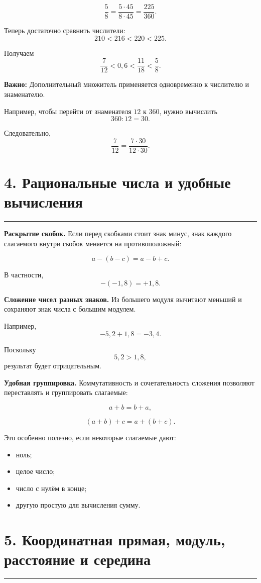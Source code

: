 \documentclass[a4paper,12pt]{article}
\newcommand{\sectionline}{
  \par
  \vspace{-0.35em}
  {\color{accent}\rule{\linewidth}{0.5pt}}
  \vspace{0.55em}
}
\newcommand{\skill}[1]{\textbf{\color{darkaccent}#1}}
\newcommand{\warn}[1]{\textbf{Важно:} #1}
\begin{document}
\[
\frac58
=
\frac{5\cdot 45}{8\cdot 45}
=
\frac{225}{360}.
\]

Теперь достаточно сравнить числители:
\[
210<216<220<225.
\]

Получаем
\[
\frac7{12}
<
0,6
<
\frac{11}{18}
<
\frac58.
\]

\warn{Дополнительный множитель применяется одновременно
к числителю и знаменателю.}

Например, чтобы перейти от знаменателя $12$ к $360$,
нужно вычислить
\[
360:12=30.
\]

Следовательно,
\[
\frac7{12}
=
\frac{7\cdot30}{12\cdot30}.
\]


\section*{4. Рациональные числа и удобные вычисления}
\sectionline

\skill{Раскрытие скобок.}
Если перед скобками стоит знак минус,
знак каждого слагаемого внутри скобок меняется
на противоположный:

\[
a-(b-c)=a-b+c.
\]

В частности,
\[
-(-1,8)=+1,8.
\]

\skill{Сложение чисел разных знаков.}
Из большего модуля вычитают меньший
и сохраняют знак числа с большим модулем.

Например,
\[
-5,2+1,8=-3,4.
\]

Поскольку
\[
5,2>1,8,
\]
результат будет отрицательным.

\skill{Удобная группировка.}
Коммутативность и сочетательность сложения позволяют
переставлять и группировать слагаемые:

\[
a+b=b+a,
\]

\[
(a+b)+c=a+(b+c).
\]

Это особенно полезно, если некоторые слагаемые дают:

\begin{itemize}
  \item ноль;
  \item целое число;
  \item число с нулём в конце;
  \item другую простую для вычисления сумму.
\end{itemize}


\section*{5. Координатная прямая, модуль, расстояние и середина}
\sectionline
\end{document}

